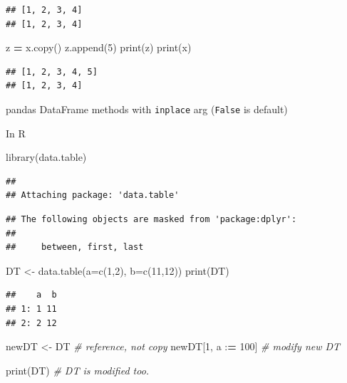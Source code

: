 \documentclass[
]{krantz}
\makeatletter
\newenvironment{Shaded}{\begin{snugshade}}{\end{snugshade}}
\newcommand{\AttributeTok}[1]{\textcolor[rgb]{0.61,0.61,0.61}{#1}}
\newcommand{\BuiltInTok}[1]{#1}
\newcommand{\CommentTok}[1]{\textcolor[rgb]{0.37,0.37,0.37}{\textit{#1}}}
\newcommand{\DecValTok}[1]{\textcolor[rgb]{0.06,0.06,0.06}{#1}}
\newcommand{\ErrorTok}[1]{\textcolor[rgb]{0.14,0.14,0.14}{\textbf{#1}}}
\newcommand{\FunctionTok}[1]{\textcolor[rgb]{0,0,0}{#1}}
\newcommand{\NormalTok}[1]{#1}
\newcommand{\OperatorTok}[1]{\textcolor[rgb]{0.43,0.43,0.43}{\textbf{#1}}}
\newcommand{\OtherTok}[1]{\textcolor[rgb]{0.37,0.37,0.37}{#1}}
\newcommand{\SpecialCharTok}[1]{\textcolor[rgb]{0,0,0}{#1}}
\newenvironment{kframe}{%
\medskip{}
\setlength{\fboxsep}{.8em}
 \def\at@end@of@kframe{}%
 \ifinner\ifhmode%
  \def\at@end@of@kframe{\end{minipage}}%
  \begin{minipage}{\columnwidth}%
 \fi\fi%
 \def\FrameCommand##1{\hskip\@totalleftmargin \hskip-\fboxsep
 \colorbox{shadecolor}{##1}\hskip-\fboxsep
     \hskip-\linewidth \hskip-\@totalleftmargin \hskip\columnwidth}%
 \MakeFramed {\advance\hsize-\width
   \@totalleftmargin\z@ \linewidth\hsize
   \@setminipage}}%
 {\par\unskip\endMakeFramed%
 \at@end@of@kframe}
\renewenvironment{Shaded}{\begin{kframe}}{\end{kframe}}
\makeatother
\begin{document}
\begin{verbatim}
## [1, 2, 3, 4]
## [1, 2, 3, 4]
\end{verbatim}

\begin{Shaded}
\begin{Highlighting}[]
\NormalTok{z }\OperatorTok{=}\NormalTok{ x.copy()}
\NormalTok{z.append(}\DecValTok{5}\NormalTok{)}
\BuiltInTok{print}\NormalTok{(z)}
\BuiltInTok{print}\NormalTok{(x)}
\end{Highlighting}
\end{Shaded}

\begin{verbatim}
## [1, 2, 3, 4, 5]
## [1, 2, 3, 4]
\end{verbatim}

pandas DataFrame methods with \texttt{inplace} arg (\texttt{False} is default)

In R

\begin{Shaded}
\begin{Highlighting}[]
\FunctionTok{library}\NormalTok{(data.table)}
\end{Highlighting}
\end{Shaded}

\begin{verbatim}
## 
## Attaching package: 'data.table'
\end{verbatim}

\begin{verbatim}
## The following objects are masked from 'package:dplyr':
## 
##     between, first, last
\end{verbatim}

\begin{Shaded}
\begin{Highlighting}[]
\NormalTok{DT }\OtherTok{\textless{}{-}} \FunctionTok{data.table}\NormalTok{(}\AttributeTok{a=}\FunctionTok{c}\NormalTok{(}\DecValTok{1}\NormalTok{,}\DecValTok{2}\NormalTok{), }\AttributeTok{b=}\FunctionTok{c}\NormalTok{(}\DecValTok{11}\NormalTok{,}\DecValTok{12}\NormalTok{))}
\FunctionTok{print}\NormalTok{(DT)}
\end{Highlighting}
\end{Shaded}

\begin{verbatim}
##    a  b
## 1: 1 11
## 2: 2 12
\end{verbatim}

\begin{Shaded}
\begin{Highlighting}[]
\NormalTok{newDT }\OtherTok{\textless{}{-}}\NormalTok{ DT        }\CommentTok{\# reference, not copy}
\NormalTok{newDT[}\DecValTok{1}\NormalTok{, a }\SpecialCharTok{:}\ErrorTok{=} \DecValTok{100}\NormalTok{] }\CommentTok{\# modify new DT}

\FunctionTok{print}\NormalTok{(DT)          }\CommentTok{\# DT is modified too.}
\end{Highlighting}
\end{Shaded}
\end{document}
